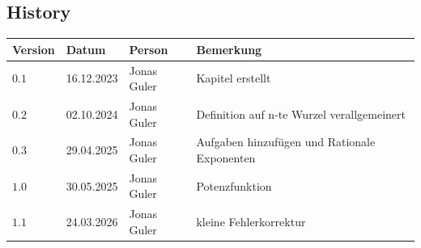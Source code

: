 \documentclass[11pt,oneside]{article}
\begin{document}
\subsection*{History}
\begin{table}[H]
	\centering
	\begin{tabular}{|p{13mm}|p{20mm}|p{30mm}|p{70mm}|}\hline
		Version & Datum & Person & Bemerkung \\\hline
		$0.1$ & 16.12.2023 & Jonas Guler & Kapitel erstellt \\\hline
		$0.2$ & 02.10.2024 & Jonas Guler & Definition auf n-te Wurzel verallgemeinert \\\hline
		$0.3$ & 29.04.2025 & Jonas Guler & Aufgaben hinzufügen und Rationale Exponenten \\\hline
		$1.0$ & 30.05.2025 & Jonas Guler & Potenzfunktion \\\hline
		$1.1$ & 24.03.2026 & Jonas Guler & kleine Fehlerkorrektur \\\hline
	\end{tabular}
\end{table}
\end{document}
